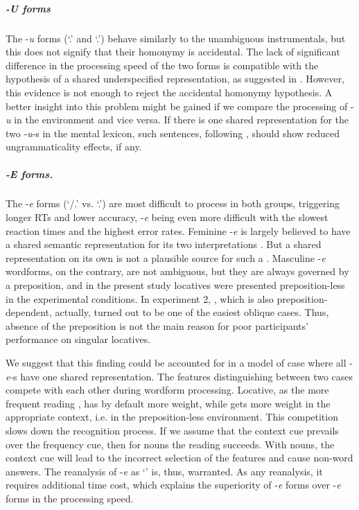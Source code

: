 \documentclass[output=paper, modfonts,newtxmath,hidelinks]{langscibook}
\begin{document}
\subparagraph*{{-U forms}} The -\textit{u} forms (`\accc.\fem' and `\datt.\masc') behave similarly to the unambiguous instrumentals, but this does not signify that their homonymy is accidental. The lack of significant difference in the processing speed of the two forms  is compatible with the hypothesis of a shared underspecified representation, as suggested in  \citet{muller2004decomposing,wunderlich2004there}. However, this evidence is not enough to reject the accidental homonymy hypothesis. A better insight into this problem might be gained if we compare the processing of  -\textit{u} in the  environment and vice versa. If there is one shared representation for the two -\textit{u}-s in the mental lexicon, such sentences, following \citet{penke2004psycholinguistic, opitz2013neurophysiological}, should show reduced ungrammaticality effects, if any.

\subparagraph*{{-E forms.}} The -\textit{e} forms (`\datt/\locc.\fem' vs. `\locc.\masc') are most difficult to process in both  groups, triggering longer RTs and lower accuracy,  -\textit{e} being even more difficult with the slowest reaction times and the highest error rates. Feminine -\textit{e} is largely believed to have a shared semantic representation for its two interpretations \citep{muller2004decomposing, wiese2004categories, wunderlich2004there}. But a shared representation on its own is not a plausible source for such a . Masculine -\textit{e} wordforms, on the contrary, are not ambiguous, but they are always governed by a preposition, and in the present study locatives were presented preposition-less in the experimental conditions. In experiment 2,  , which is also preposition-dependent, actually, turned out to be one of the easiest oblique cases. Thus, absence of the preposition is not the main reason for poor participants’ performance on singular  locatives. 

We suggest that this finding could be accounted for in a model of  case where all -\textit{e}-s have one shared representation. The features distinguishing between two cases compete with each other during wordform processing. Locative, as the more frequent reading \citep{samojlova2014frequencies}, has by default more weight, while  gets more weight in the appropriate context, i.e. in the preposition-less environment. This competition slows down the recognition process. If we assume that the context cue prevails over the frequency cue, then for  nouns the  reading succeeds. With  nouns, the context cue will lead to the incorrect selection of the  features and cause non-word answers. The reanalysis of -\textit{e} as `\locc' is, thus, warranted. As any reanalysis, it requires additional time cost, which explains the superiority of  -\textit{e} forms over  -\textit{e} forms in the processing speed. 
\end{document}
